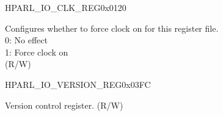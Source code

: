 \begin{register}{H}{PARL\_IO\_CLK\_REG}{0x0120}\label{regdesc:PARLIOCLKREG}
%
%
\regnewline%
\begin{regdesc}\begin{reglist}
\label{fielddesc:PARLIOCLKEN}\item [PARL\_IO\_CLK\_EN] Configures whether to force clock on for this register file.\\
0: No effect\\
1: Force clock on\\
(R/W)
\end{reglist}\end{regdesc}
\end{register}


\begin{register}{H}{PARL\_IO\_VERSION\_REG}{0x03FC}\label{regdesc:PARLIOVERSIONREG}
%
%
\regnewline%
\begin{regdesc}\begin{reglist}
\label{fielddesc:PARLIODATE}\item [PARL\_IO\_DATE] Version control register. (R/W)
\end{reglist}\end{regdesc}
\end{register}
